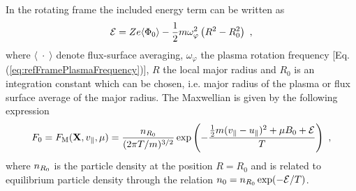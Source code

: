 In the rotating frame the included energy term can be written as 
\begin{gather}
	\mathcal{E} = Z e \langle \Phi_0 \rangle - \frac{1}{2} m \omega_\varphi^2 \left(R^2 - R_0^2\right)~,
	\label{eq:rotEnergy}
\end{gather}
where $\langle\;\cdot\;\rangle$ denote flux-surface averaging, $\omega_\varphi$ the plasma rotation frequency [Eq. (\ref{eq:refFramePlasmaFrequency})], $R$ the local major radius and $R_0$ is an integration constant which can be chosen, i.e. major radius of the plasma or flux surface average of the major radius. The Maxwellian is given by the following expression
\begin{gather}
	F_0 = F_\mathrm{M}(\boldsymbol{\mathbf{X}}, v_\parallel, \mu) = \frac{n_{R_0}}{(2\pi T/m)^{3/2}}\exp\left(-\frac{\frac{1}{2} m (v_\parallel - u_\parallel)^2 + \mu B_0 + \mathcal{E}}{T}\right)~,
	\label{eq:maxwellian}
\end{gather}   
where $n_{R_0}$ is the particle density at the position $R = R_0$ and is related to equilibrium particle density through the relation $n_0 = n_{R_0} \exp(-\mathcal{E}/T)$. \cite{Peeters2009B} 

